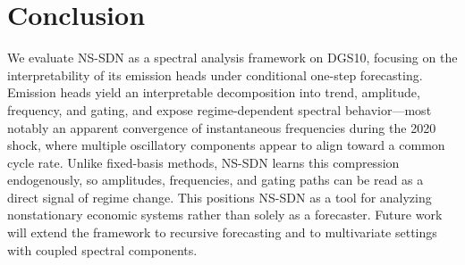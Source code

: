 \section{Conclusion}
We evaluate NS-SDN as a spectral analysis framework on DGS10, focusing on the interpretability of its emission heads under conditional one-step forecasting. Emission heads yield an interpretable decomposition into trend, amplitude, frequency, and gating, and expose regime-dependent spectral behavior---most notably an apparent convergence of instantaneous frequencies during the 2020 shock, where multiple oscillatory components appear to align toward a common cycle rate.
Unlike fixed-basis methods, NS-SDN learns this compression endogenously, so amplitudes, frequencies, and gating paths can be read as a direct signal of regime change. This positions NS-SDN as a tool for analyzing nonstationary economic systems rather than solely as a forecaster. Future work will extend the framework to recursive forecasting and to multivariate settings with coupled spectral components.
